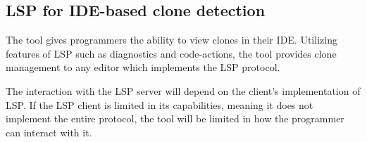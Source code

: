 \subsection{LSP for IDE-based clone detection}

The tool gives programmers the ability to view clones in their IDE. Utilizing features of
LSP such as diagnostics and code-actions, the tool provides clone management to any
editor which implements the LSP protocol.


The interaction with the LSP server will depend on the client's implementation of LSP. If
the LSP client is limited in its capabilities, meaning it does not implement the entire
protocol, the tool will be limited in how the programmer can interact with it.

